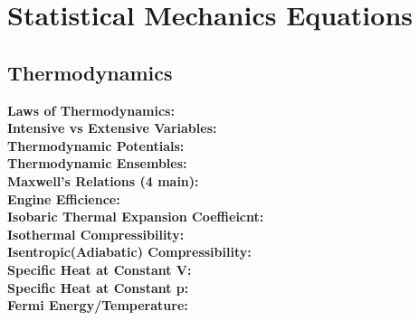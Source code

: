 \documentclass[12pt]{extarticle}
\begin{document}
\section{Statistical Mechanics Equations}
\subsection{Thermodynamics}
\textbf{Laws of Thermodynamics:} \\
\textbf{Intensive vs Extensive Variables:} \\
\textbf{Thermodynamic Potentials:} \\
\textbf{Thermodynamic Ensembles:} \\
\textbf{Maxwell's Relations (4 main):} \\
\textbf{Engine Efficience:} \\
\textbf{Isobaric Thermal Expansion Coeffieicnt: } \\
\textbf{Isothermal Compressibility:} \\
\textbf{Isentropic(Adiabatic) Compressibility:} \\
\textbf{Specific Heat at Constant V:} \\
\textbf{Specific Heat at Constant p:} \\
\textbf{Fermi Energy/Temperature: } \\
\end{document}
